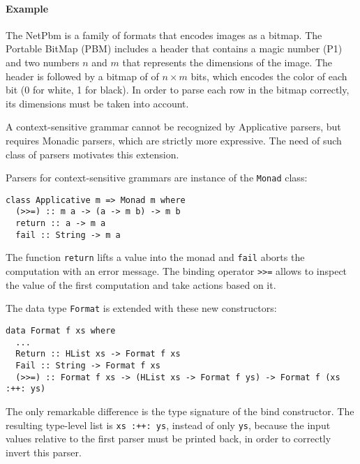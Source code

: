 \documentclass[../Thesis.tex]{subfiles}
\begin{document}
\paragraph{Example}
The NetPbm is a family of formats that encodes images as a bitmap. 
The Portable BitMap (PBM) includes a header that contains a magic number (P1) and two numbers $n$ and $m$ that represents the dimensions of the image. The header is followed by a bitmap of of $n \times m$ bits, which encodes the color of each bit (0 for white, 1 for black). In order to parse each row in the bitmap correctly, its dimensions must be taken into account.

A context-sensitive grammar cannot be recognized by Applicative parsers, but requires Monadic parsers, which are 
strictly more expressive. The need of such class of parsers motivates this extension.

Parsers for context-sensitive grammars are instance of the \texttt{Monad} class:

\begin{verbatim}
class Applicative m => Monad m where
  (>>=) :: m a -> (a -> m b) -> m b
  return :: a -> m a
  fail :: String -> m a
\end{verbatim}

The function \texttt{return} lifts a value into the monad and \texttt{fail}
aborts the computation with an error message.
The binding operator \texttt{>>=} allows to inspect the value of the first computation and take actions based on it.

The data type \texttt{Format} is extended with these new constructors:

\begin{verbatim}
data Format f xs where
  ...
  Return :: HList xs -> Format f xs
  Fail :: String -> Format f xs
  (>>=) :: Format f xs -> (HList xs -> Format f ys) -> Format f (xs :++: ys)
\end{verbatim}

The only remarkable difference is the type signature of the bind constructor. 
The resulting type-level list is \texttt{xs :++: ys},
instead of only \texttt{ys}, because the input values relative to the first parser 
must be printed back, in order to correctly invert this parser.

%
\end{document}
